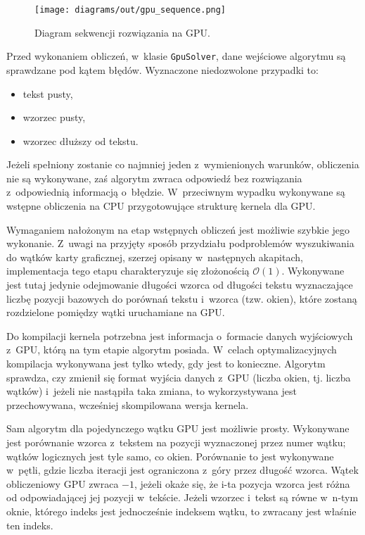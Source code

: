 \begin{figure}
    \centering
    \texttt{[image: diagrams/out/gpu\_sequence.png]}
    \caption{Diagram sekwencji rozwiązania na GPU.}
    \label{DiagramSequenceGPU}
\end{figure}

\begin{samepage}

    Przed wykonaniem obliczeń, w~klasie \texttt{GpuSolver}, dane wejściowe algorytmu są sprawdzane pod kątem błędów. Wyznaczone niedozwolone przypadki to:
    \begin{itemize}[noitemsep]
        \item tekst pusty,
        \item wzorzec pusty,
        \item wzorzec dłuższy od tekstu.
    \end{itemize}
\end{samepage}

Jeżeli spełniony zostanie co najmniej jeden z~wymienionych warunków, obliczenia nie są wykonywane, zaś algorytm zwraca odpowiedź bez rozwiązania z~odpowiednią informacją o~błędzie. W~przeciwnym wypadku wykonywane są wstępne obliczenia na CPU przygotowujące strukturę kernela dla GPU.

Wymaganiem nałożonym na etap wstępnych obliczeń jest możliwie szybkie jego wykonanie. Z~uwagi na przyjęty sposób przydziału podproblemów wyszukiwania do wątków karty graficznej, szerzej opisany w~następnych akapitach, implementacja tego etapu charakteryzuje się złożonością $\mathcal{O}(1)$. Wykonywane jest tutaj jedynie odejmowanie długości wzorca od długości tekstu wyznaczające liczbę pozycji bazowych do porównań tekstu i~wzorca (tzw. okien), które zostaną rozdzielone pomiędzy wątki uruchamiane na GPU.

Do kompilacji kernela potrzebna jest informacja o~formacie danych wyjściowych z~GPU, którą na tym etapie algorytm posiada. W~celach optymalizacyjnych kompilacja wykonywana jest tylko wtedy, gdy jest to konieczne. Algorytm sprawdza, czy zmienił się format wyjścia danych z~GPU (liczba okien, tj. liczba wątków) i~jeżeli nie nastąpiła taka zmiana, to wykorzystywana jest przechowywana, wcześniej skompilowana wersja kernela.

Sam algorytm dla pojedynczego wątku GPU jest możliwie prosty. Wykonywane jest porównanie wzorca z~tekstem na pozycji wyznaczonej przez numer wątku; wątków logicznych jest tyle samo, co okien. Porównanie to jest wykonywane w~pętli, gdzie liczba iteracji jest ograniczona z~góry przez długość wzorca. Wątek obliczeniowy GPU zwraca $-1$, jeżeli okaże się, że i-ta pozycja wzorca jest różna od odpowiadającej jej pozycji w~tekście. Jeżeli wzorzec i~tekst są równe w~n-tym oknie, którego indeks jest jednocześnie indeksem wątku, to zwracany jest właśnie ten indeks.

